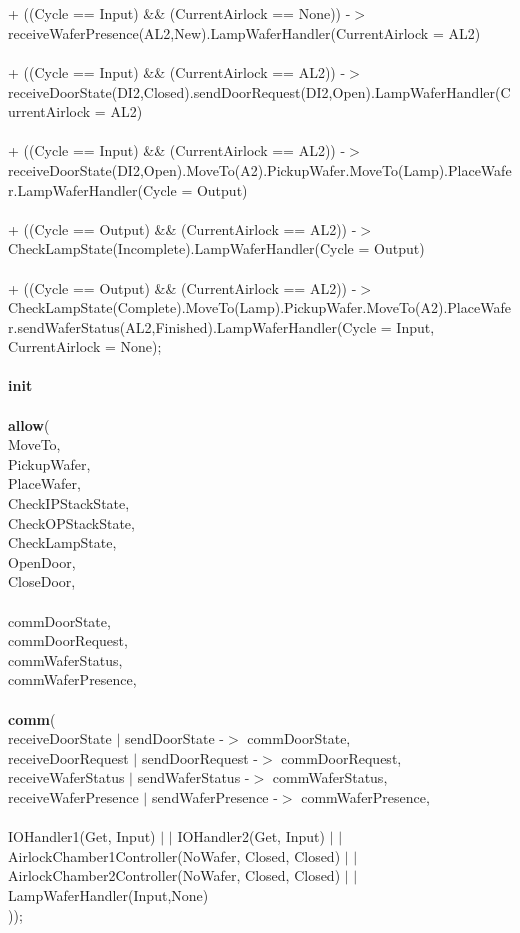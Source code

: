 \documentclass[a4paper,12pt]{article}
\begin{document}
\\
\\+ ((Cycle == Input) \&\& (CurrentAirlock == None)) -$>$ receiveWaferPresence(AL2,New).LampWaferHandler(CurrentAirlock = AL2)
\\
\\+ ((Cycle == Input) \&\& (CurrentAirlock == AL2)) -$>$ receiveDoorState(DI2,Closed).sendDoorRequest(DI2,Open).LampWaferHandler(CurrentAirlock = AL2)
\\
\\+ ((Cycle == Input) \&\& (CurrentAirlock == AL2)) -$>$ receiveDoorState(DI2,Open).MoveTo(A2).PickupWafer.MoveTo(Lamp).PlaceWafer.LampWaferHandler(Cycle = Output)
\\
\\+ ((Cycle == Output) \&\& (CurrentAirlock == AL2)) -$>$ CheckLampState(Incomplete).LampWaferHandler(Cycle = Output)
\\
\\+ ((Cycle == Output) \&\& (CurrentAirlock == AL2)) -$>$ CheckLampState(Complete).MoveTo(Lamp).PickupWafer.MoveTo(A2).PlaceWafer.sendWaferStatus(AL2,Finished).LampWaferHandler(Cycle = Input, CurrentAirlock = None);
\\
\\\textbf{init} 
\\
\\\textbf{			allow}(
\\						{MoveTo,
 \\ 				 	 PickupWafer,
 \\				 		 PlaceWafer,
 \\	    			 CheckIPStackState,
\\	  				 CheckOPStackState,
\\						 CheckLampState,
\\						 OpenDoor,
\\						 CloseDoor,
\\
\\						 commDoorState,
\\						 commDoorRequest,
\\						 commWaferStatus,
\\						 commWaferPresence},
\\
\\\textbf{			comm}(
\\						{receiveDoorState $|$ sendDoorState -$>$ commDoorState,
\\						receiveDoorRequest $|$ sendDoorRequest -$>$ commDoorRequest,
\\	  				 	receiveWaferStatus $|$ sendWaferStatus -$>$ commWaferStatus,
\\				 	   receiveWaferPresence $|$ sendWaferPresence -$>$ commWaferPresence},
\\
\\						 IOHandler1(Get, Input) $|$ $|$ IOHandler2(Get, Input) $|$ $|$ AirlockChamber1Controller(NoWafer, Closed, Closed) $|$ $|$ AirlockChamber2Controller(NoWafer, Closed, Closed) $|$ $|$ LampWaferHandler(Input,None)
\\					 ));
\newpage
\end{document}
